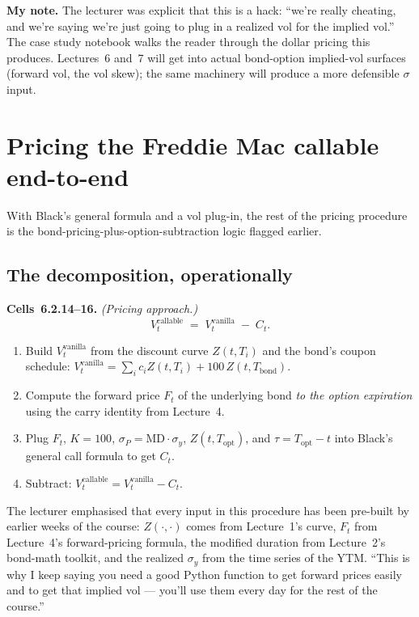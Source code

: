 \begin{checkpoint}
\textbf{My note.} The lecturer was explicit that this is a hack:
``we're really cheating, and we're saying we're just going to plug in
a realized vol for the implied vol.'' The case study notebook walks
the reader through the dollar pricing this produces. Lectures~6 and~7
will get into actual bond-option implied-vol surfaces (forward vol,
the vol skew); the same machinery will produce a more defensible
$\sigma$ input.
\end{checkpoint}

\section{Pricing the Freddie Mac callable end-to-end}\label{L5-sec:pricing}

With Black's general formula and a vol plug-in, the rest of the
pricing procedure is the bond-pricing-plus-option-subtraction logic
flagged earlier.

\subsection{The decomposition, operationally}\label{L5-sec:pricing-decomp}

\begin{keyblock}
\textbf{Cells~6.2.14--16.} \emph{(Pricing approach.)}\\
\[
  V^{\text{callable}}_t
   \;=\; V^{\text{vanilla}}_t \;-\; C_t.
\]
\begin{enumerate}[label=(\arabic*)]
  \item Build $V^{\text{vanilla}}_t$ from the discount curve $Z(t,T_i)$
        and the bond's coupon schedule:
        $V^{\text{vanilla}}_t = \sum_i c_i Z(t, T_i) + 100\, Z(t,
        T_{\text{bond}})$.
  \item Compute the forward price $F_t$ of the underlying bond \emph{to
        the option expiration} using the carry identity from
        Lecture~4.
  \item Plug $F_t$, $K=100$, $\sigma_P = \mathrm{MD}\cdot\sigma_y$, $Z(t,
        T_{\text{opt}})$, and $\tau = T_{\text{opt}} - t$ into Black's
        general call formula to get $C_t$.
  \item Subtract: $V^{\text{callable}}_t = V^{\text{vanilla}}_t - C_t$.
\end{enumerate}
\end{keyblock}

The lecturer emphasised that every input in this procedure has been
pre-built by earlier weeks of the course: $Z(\cdot, \cdot)$ comes
from Lecture~1's curve, $F_t$ from Lecture~4's forward-pricing
formula, the modified duration from Lecture~2's bond-math toolkit, and
the realized $\sigma_y$ from the time series of the YTM. ``This is why
I keep saying you need a good Python function to get forward prices
easily and to get that implied vol --- you'll use them every day for
the rest of the course.''

